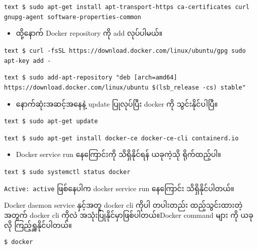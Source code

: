 \texttt{text   \$ sudo apt-get install apt-transport-https ca-certificates curl gnupg-agent software-properties-common}

\begin{itemize}
\itemsep1pt\parskip0pt
\item
  ထို့နောက် Docker repository ကို add လုပ်ပါမယ်။
\end{itemize}

\texttt{text   \$ curl -fsSL https://download.docker.com/linux/ubuntu/gpg \textbar{} sudo apt-key add -}

\texttt{text   \$ sudo add-apt-repository "deb {[}arch=amd64{]} https://download.docker.com/linux/ubuntu \$(lsb\_release -cs) stable"}

\begin{itemize}
\itemsep1pt\parskip0pt
\item
  နောက်ဆုံးအဆင့်အနေနဲ့ update ပြုလုပ်ပြီး docker ကို သွင်းနိုင်ပါပြီ။
\end{itemize}

\texttt{text   \$ sudo apt-get update}

\texttt{text   \$ sudo apt-get install docker-ce docker-ce-cli containerd.io}

\begin{itemize}
\itemsep1pt\parskip0pt
\item
  Docker service run နေကြောင်းကို သိရှိနိုင်ရန် ယခုကဲ့သို ရိုက်ထည့်ပါ။
\end{itemize}

\texttt{text   \$ sudo systemctl status docker}

\texttt{Active: active} ဖြစ်နေပါက docker service run နေကြောင်း
သိရှိနိုင်ပါတယ်။

Docker daemon service နှင့်အတူ docker cli ကိုပါ တပါးတည်း ထည့်သွင်းထားတဲ့
အတွက် docker cli ကိုလဲ အသုံးပြုနိုင်မှာဖြစ်ပါတယ်။Docker command များ ကို
ယခုလို ကြည့်ရှူနိုင်ပါတယ်။

\begin{verbatim}
$ docker
\end{verbatim}


